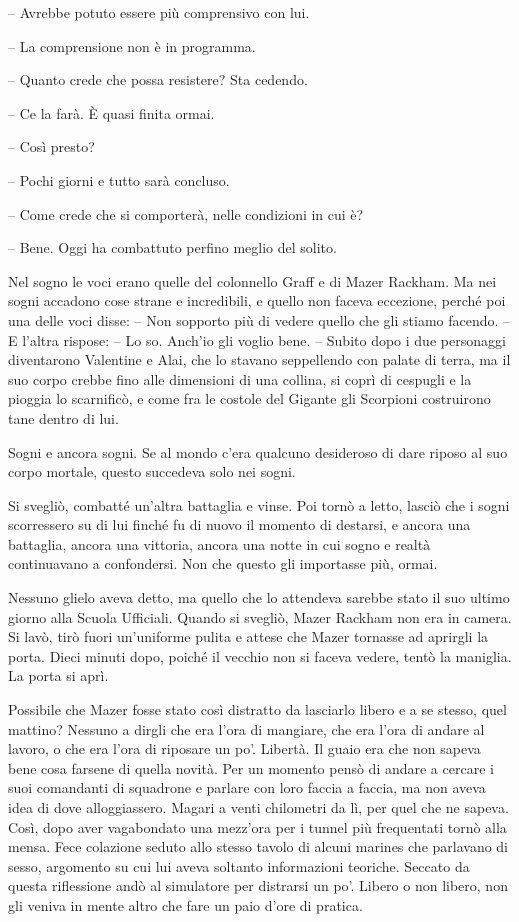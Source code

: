 {-- Avrebbe potuto essere più comprensivo con lui.}

{-- La comprensione non è in programma.}

{-- Quanto crede che possa resistere? Sta cedendo.}

{-- Ce la farà. È quasi finita ormai.}

{-- Così presto?}

{-- Pochi giorni e tutto sarà concluso.}

{-- Come crede che si comporterà, nelle condizioni in cui è?}

{-- Bene. Oggi ha combattuto perfino meglio del solito.}

{Nel sogno le voci erano quelle del colonnello Graff e di Mazer Rackham.
	Ma nei sogni accadono cose strane e incredibili, e quello non faceva
	eccezione, perché poi una delle voci disse: -- Non sopporto più di
	vedere quello che gli stiamo facendo. -- E l'altra rispose: -- Lo so.
	Anch'io gli voglio bene. -- Subito dopo i due personaggi diventarono
	Valentine e Alai, che lo stavano seppellendo con palate di terra, ma il
	suo corpo crebbe fino alle dimensioni di una collina, si coprì di
	cespugli e la pioggia lo scarnificò, e come fra le costole del Gigante
	gli Scorpioni costruirono tane dentro di lui.}

{Sogni e ancora sogni. Se al mondo c'era qualcuno desideroso di dare
	riposo al suo corpo mortale, questo succedeva solo nei sogni.}

{Si svegliò, combatté un'altra battaglia e vinse. Poi tornò a letto,
	lasciò che i sogni scorressero su di lui finché fu di nuovo il momento
	di destarsi, e ancora una battaglia, ancora una vittoria, ancora una
	notte in cui sogno e realtà continuavano a confondersi. Non che questo
	gli importasse più, ormai.}

{Nessuno glielo aveva detto, ma quello che lo attendeva sarebbe stato il
	suo ultimo giorno alla Scuola Ufficiali. Quando si svegliò, Mazer
	Rackham non era in camera. Si lavò, tirò fuori un'uniforme pulita e
	attese che Mazer tornasse ad aprirgli la porta. Dieci minuti dopo,
	poiché il vecchio non si faceva vedere, tentò la maniglia. La porta si
	aprì.}

{Possibile che Mazer fosse stato così distratto da lasciarlo libero e a
	se stesso, quel mattino? Nessuno a dirgli che era l'ora di mangiare, che
	era l'ora di andare al lavoro, o che era l'ora di riposare un po'.
	Libertà. Il guaio era che non sapeva bene cosa farsene di quella novità.
	Per un momento pensò di andare a cercare i suoi comandanti di squadrone
	e parlare con loro faccia a faccia, ma non aveva idea di dove
	alloggiassero. Magari a venti chilometri da lì, per quel che ne sapeva.
	Così, dopo aver vagabondato una mezz'ora per i tunnel più frequentati
	tornò alla mensa. Fece colazione seduto allo stesso tavolo di alcuni
	marines che parlavano di sesso, argomento su cui lui aveva soltanto
	informazioni teoriche. Seccato da questa riflessione andò al simulatore
	per distrarsi un po'. Libero o non libero, non gli veniva in mente altro
	che fare un paio d'ore di pratica.}

